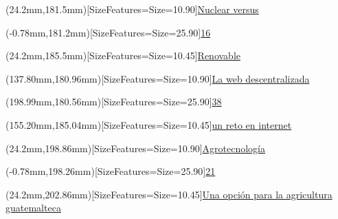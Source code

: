 \documentclass[12pt,spanish,Letterpaper,openany]{book}
\begin{document}
\begin{textblock*}{\textwidth}(24.2mm,181.5mm)[SizeFeatures={Size=10.90}]{\color{titlePart1Contenido}\protect\hyperlink{article06}{Nuclear versus}}\end{textblock*}

\begin{textblock*}{\textwidth}(-0.78mm,181.2mm)[SizeFeatures={Size=25.90}]{\color{white}\protect\hyperlink{article06}{16}}\end{textblock*}

\begin{textblock*}{\textwidth}(24.2mm,185.5mm)[SizeFeatures={Size=10.45}]{\color{titlePart2Contenido}\protect\hyperlink{article06}{Renovable}}\end{textblock*}

\begin{textblock*}{\textwidth}(137.80mm,180.96mm)[SizeFeatures={Size=10.90}]{\color{titlePart1Contenido}\protect\hyperlink{article11}{La web descentralizada}}\end{textblock*}

\begin{textblock*}{\textwidth}(198.99mm,180.56mm)[SizeFeatures={Size=25.90}]{\color{white}\protect\hyperlink{article11}{38}}\end{textblock*}

\begin{textblock*}{\textwidth}(155.20mm,185.04mm)[SizeFeatures={Size=10.45}]{\color{titlePart2Contenido}\protect\hyperlink{article11}{un reto en internet}}\end{textblock*}

\begin{textblock*}{\textwidth}(24.2mm,198.86mm)[SizeFeatures={Size=10.90}]{\color{titlePart1Contenido}\protect\hyperlink{article07}{Agrotecnología}}\end{textblock*}

\begin{textblock*}{\textwidth}(-0.78mm,198.26mm)[SizeFeatures={Size=25.90}]{\color{white}\protect\hyperlink{article07}{21}}\end{textblock*}

\begin{textblock*}{\textwidth}(24.2mm,202.86mm)[SizeFeatures={Size=10.45}]{\color{titlePart2Contenido}\protect\hyperlink{article07}{Una opción para la agricultura guatemalteca}}\end{textblock*}
\end{document}
